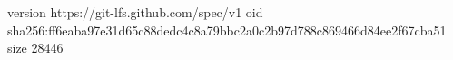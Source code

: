 version https://git-lfs.github.com/spec/v1
oid sha256:ff6eaba97e31d65c88dedc4c8a79bbc2a0c2b97d788c869466d84ee2f67cba51
size 28446
